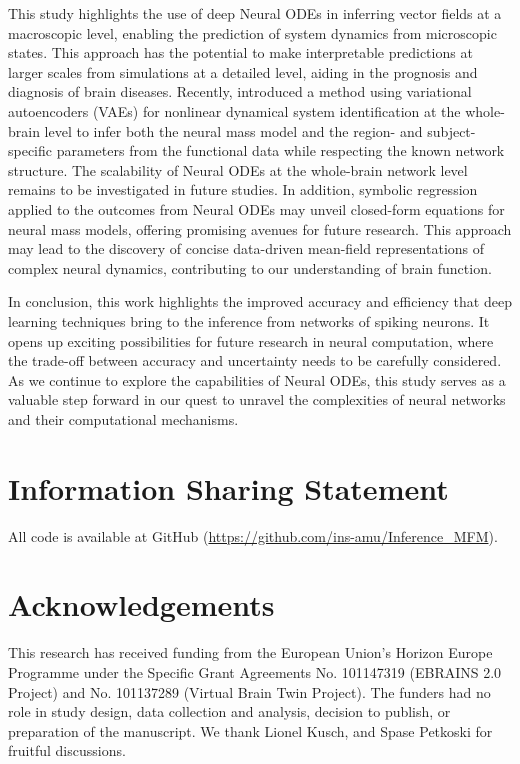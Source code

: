 \documentclass[preprint,11pt,authoryear]{elsarticle}
\begin{document}
This study highlights the use of deep Neural ODEs in inferring vector fields at a macroscopic level, enabling the prediction of system dynamics from microscopic states. This approach has the potential to make interpretable predictions at larger scales from simulations at a detailed level, aiding in the prognosis and diagnosis of brain diseases. Recently, \cite{Sip2023} introduced a method using variational autoencoders (VAEs) for nonlinear dynamical system identification at the whole-brain level to infer both the neural mass model and the region- and subject-specific parameters from the functional data while respecting the known network structure. The scalability of Neural ODEs at the whole-brain network level remains to be investigated in future studies. In addition, symbolic regression applied to the outcomes from Neural ODEs may unveil closed-form equations for neural mass models, offering promising avenues for future research. This approach may lead to the discovery of concise data-driven mean-field representations of complex neural dynamics, contributing to our understanding of brain function.



In conclusion, this work highlights the improved accuracy and efficiency that deep learning techniques bring to the inference from networks of spiking neurons. It opens up exciting possibilities for future research in neural computation, where the trade-off between accuracy and uncertainty needs to be carefully considered. As we continue to explore the capabilities of Neural ODEs, this study serves as a valuable step forward in our quest to unravel the complexities of neural networks and their computational mechanisms.




\section*{Information Sharing Statement}

All code is available at GitHub (\url{https://github.com/ins-amu/Inference_MFM}).


\section*{Acknowledgements}

This research has received funding from the European Union's Horizon Europe Programme under the Specific Grant Agreements No. 101147319 (EBRAINS 2.0 Project) and No. 101137289 (Virtual Brain Twin Project). The funders had no role in study design, data collection and analysis, decision to publish, or preparation of the manuscript. We thank Lionel Kusch, and Spase Petkoski for fruitful discussions.
\end{document}
